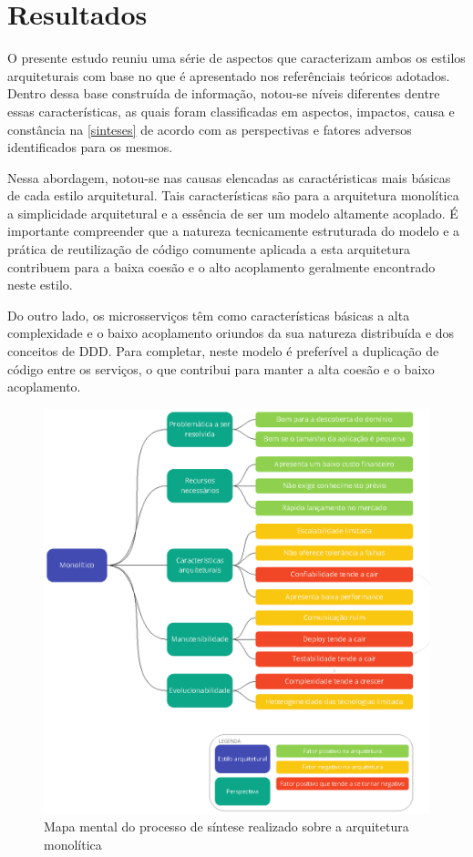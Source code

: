 \chapter{Resultados}

O presente estudo reuniu uma série de aspectos que caracterizam ambos os estilos arquiteturais com
base no que é apresentado nos referênciais teóricos adotados. Dentro dessa base construída de
informação, notou-se níveis diferentes dentre essas características, as quais foram classificadas em
aspectos, impactos, causa e constância na \autoref{sinteses} de acordo com as perspectivas e fatores
adversos identificados para os mesmos.

Nessa abordagem, notou-se nas causas elencadas as caractéristicas mais básicas de cada estilo
arquitetural. Tais características são para a arquitetura monolítica a simplicidade arquitetural e a
essência de ser um modelo altamente acoplado. É importante compreender que a natureza tecnicamente
estruturada do modelo e a prática de reutilização de código comumente aplicada a esta arquitetura
contribuem para a baixa coesão e o alto acoplamento geralmente encontrado neste estilo.

Do outro lado, os microsserviços têm como características básicas a alta complexidade e o baixo
acoplamento oriundos da sua natureza distribuída e dos conceitos de \gls{DDD}. Para completar, neste
modelo é preferível a duplicação de código entre os serviços, o que contribui para manter a alta
coesão e o baixo acoplamento.

\begin{figure}[h]
  \centering
  \includegraphics[keepaspectratio=true,scale=1]{figuras/sintese-monolitico.eps}
  \caption{Mapa mental do processo de síntese realizado sobre a arquitetura
  monolítica\label{fig:SinteseMono-resultados}}
\end{figure}

